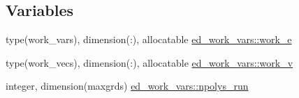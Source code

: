 \subsection*{Variables}
\begin{DoxyCompactItemize}
\item 
type(work\+\_\+vars), dimension(\+:), allocatable \hyperlink{namespaceed__work__vars_a9587eaf2a297aea9337288fbd4697cde}{ed\+\_\+work\+\_\+vars\+::work\+\_\+e}
\item 
type(work\+\_\+vecs), dimension(\+:), allocatable \hyperlink{namespaceed__work__vars_aad831dc3295b5ee4dbd0b01c0fe47e37}{ed\+\_\+work\+\_\+vars\+::work\+\_\+v}
\item 
integer, dimension(maxgrds) \hyperlink{namespaceed__work__vars_aeed3989f9c97cab11bdf68227df4b75d}{ed\+\_\+work\+\_\+vars\+::npolys\+\_\+run}
\end{DoxyCompactItemize}
